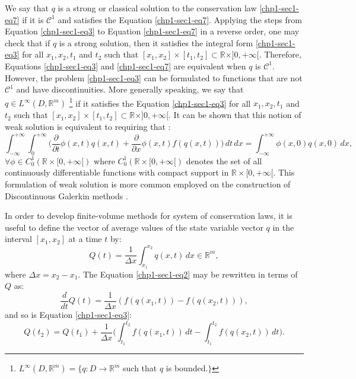 We say that ${q}$ is a strong or classical solution to the conservation law \eqref{chp1-sec1-eq7}
if it is $\mathcal{C}^1$ and satisfies the Equation \eqref{chp1-sec1-eq7}.
Applying the steps from Equation \eqref{chp1-sec1-eq3} to Equation \eqref{chp1-sec1-eq7}
in a reverse order, one may check that if ${q}$ is a strong solution,
then it satisfies the integral form \eqref{chp1-sec1-eq3} for all $x_1, x_2, t_1$ and $t_2$ such that
$[x_1, x_2] \times [t_1, t_2] \subset \mathbb{R}\times ]0, +\infty[$. 
Therefore, Equations \eqref{chp1-sec1-eq3} and \eqref{chp1-sec1-eq7} are
equivalent when ${q}$ is $\mathcal{C}^1$.
However, the problem \eqref{chp1-sec1-eq3} can be formulated
to functions that are not $\mathcal{C}^1$ and have discontinuities.
More generally speaking, we say that ${q} \in L^{\infty}(D, \mathbb{R}^m)$ 
\footnote{$L^{\infty}(D, \mathbb{R}^m) = \{q: D \to \mathbb{R}^m$
such that $q$ is bounded.$\}$}
if it satisfies the Equation 
\eqref{chp1-sec1-eq3} for all $x_1, x_2, t_1$ and $t_2$ such that
$[x_1, x_2] \times [t_1, t_2] \subset \mathbb{R}\times ]0, +\infty[$.
It can be shown that this notion of weak solution is equivalent to requiring that \citep{leveque:1990}:
\begin{equation}
	\label{chp1-sec1-eq8}
	\int_{-\infty}^{+\infty} \int_{0}^{+\infty} \bigg(
	\frac{\partial}{\partial t} \phi(x, t){q}(x, t) +
	\frac{\partial}{\partial x} \phi(x ,t){f}({q}(x, t)) 
	\bigg)\,dt \,dx = 
	\int_{-\infty}^{+\infty} \phi(x, 0){q}(x, 0) \,dx  , \quad
\end{equation}
$\forall \phi \in C_{0}^{1}(\mathbb{R}\times[0, +\infty[)$
where $C_{0}^{1}(\mathbb{R}\times[0, +\infty[)$ denotes the set
of all continuously differentiable functions with compact support 
in $\mathbb{R}\times[0, +\infty[$. This formulation of weak solution
is more common employed on the construction of Discontinuous Galerkin
methods \citep{nair:2011}.

In order to develop finite-volume methods for system of conservation laws, it is useful to define the vector of
average values of the state variable vector ${q}$ in the interval $[x_1, x_2]$ at a time $t$ by:
\begin{equation}
	\label{chp1-sec1-eq9}
	{Q}(t) = \frac{1}{\Delta x}
	\int_{x_1}^{x_2} {q}(x,t) \,dx
	\in \mathbb{R}^m,
\end{equation}
where $\Delta x = x_2 - x_1$. The Equation \eqref{chp1-sec1-eq2} may be  rewritten in terms of ${Q}$ as:
\begin{equation}
        \label{chp1-sec1-eq10}
	\frac{d}{dt} {Q}(t) = \frac{1}{\Delta x} 
	({f}({q}(x_1,t)) - {f}({q}(x_2,t))) ,
\end{equation}
and so is Equation \eqref{chp1-sec1-eq3}:
\begin{equation}
        \label{chp1-sec1-eq11}
	{Q}(t_2) =  {Q}(t_1) + 
	\frac{1}{\Delta x}\bigg( \int_{t_1}^{t_2} 
	{f}({q}(x_1, t)) \,dt - 
	\int_{t_1}^{t_2}{f}({q}(x_2, t)) \,dt \bigg).
\end{equation}

